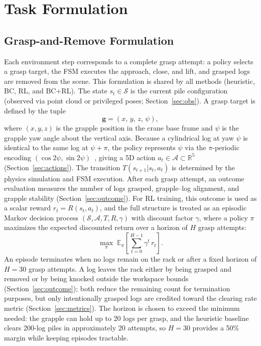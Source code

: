 \documentclass[conference]{IEEEtran}
\begin{document}
\section{Task Formulation}
\subsection{Grasp-and-Remove Formulation}
\label{sec:formulation}
Each environment step corresponds to a complete grasp attempt: a policy selects a grasp target, the FSM executes the approach, close, and lift, and grasped logs are removed from the scene.
This formulation is shared by all methods (heuristic, BC, RL, and BC+RL).
The state $s_t \in \mathcal{S}$ is the current pile configuration (observed via point cloud or privileged poses; Section~\ref{sec:obs}).
A grasp target is defined by the tuple
\begin{equation}
    \mathbf{g} = (x,\, y,\, z,\, \psi),
\end{equation}
where $(x, y, z)$ is the grapple position in the crane base frame and $\psi$ is the grapple yaw angle about the vertical axis.
Because a cylindrical log at yaw $\psi$ is identical to the same log at $\psi + \pi$, the policy represents $\psi$ via the $\pi$-periodic encoding $(\cos 2\psi, \sin 2\psi)$~\cite{morrison2018closing}, giving a 5D action $a_t \in \mathcal{A} \subset \mathbb{R}^5$ (Section~\ref{sec:actions}).
The transition $T(s_{t+1}|s_t, a_t)$ is determined by the physics simulation and FSM execution.
After each grasp attempt, an outcome evaluation measures the number of logs grasped, grapple--log alignment, and grapple stability (Section~\ref{sec:outcome}).
For RL training, this outcome is used as a scalar reward $r_t = R(s_t, a_t)$, and the full structure is treated as an episodic Markov decision process $(\mathcal{S}, \mathcal{A}, T, R, \gamma)$ with discount factor $\gamma$, where a policy $\pi$ maximizes the expected discounted return over a horizon of $H$ grasp attempts:
\begin{equation}
    \max_\pi \; \mathbb{E}_\pi \!\left[\sum_{t=0}^{H-1} \gamma^t \, r_t \right].
\end{equation}
An episode terminates when no logs remain on the rack or after a fixed horizon of $H=30$ grasp attempts.
A log leaves the rack either by being grasped and removed or by being knocked outside the workspace bounds (Section~\ref{sec:outcome}); both reduce the remaining count for termination purposes, but only intentionally grasped logs are credited toward the clearing rate metric (Section~\ref{sec:metrics}).
The horizon is chosen to exceed the minimum needed: the grapple can hold up to 20 logs per grasp, and the heuristic baseline clears 200-log piles in approximately 20 attempts, so $H=30$ provides a 50\% margin while keeping episodes tractable.
\end{document}
